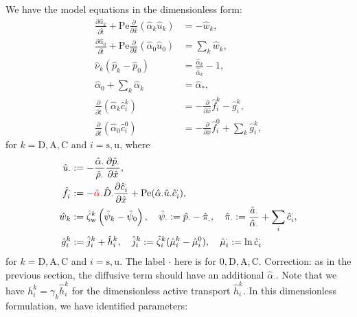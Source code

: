 \documentclass{article}
\begin{document}
We have the model equations in the dimensionless form:
\begin{align}
    \frac{\partial \hat{\alpha}_k}{\partial \hat{t}}  + \mathrm{Pe}\frac{\partial}{\partial \hat{x}}\left( \hat{\alpha}_k \hat{u}_k \right) &= - \hat{w}_k,\\ \label{eq:nd_1steq}
    \frac{\partial\hat{\alpha}_0}{\partial \hat{t}}+\mathrm{Pe}\frac{\partial}{\partial \hat{x}}\left( \hat{\alpha}_0 \hat{u}_0 \right) &=\sum_k \hat{w}_k,\\
    \hat{\nu}_k\left( \hat{p}_k - \hat{p}_0 \right) &= \frac{\hat{\alpha}_k}{\hat{\bar{\alpha}}_k}-1,\\
    \hat{\alpha}_0 + \sum_{k} \hat{\alpha}_k &= \hat{\alpha}_*,\\
    \frac{\partial}{\partial \hat{t}}\left( \hat{\alpha}_k \hat{c}_i^k \right)&=-\frac{\partial}{\partial \hat{x}} \hat{f}_i^k - \hat{g}_i^k,\\
    \frac{\partial}{\partial \hat{t}}\left( \hat{\alpha}_0 \hat{c}_i^0 \right)&=-\frac{\partial}{\partial \hat{x}} \hat{f}_i^0 + \sum_k \hat{g}_i^k,
\end{align}
    for $k=\mathrm{D},\mathrm{A},\mathrm{C}$ and $i=\mathrm{s},\mathrm{u}$, where
\begin{align}
    \hat{u}_\cdot &:= -\frac{\hat{\alpha}_\cdot}{\hat{\rho}_\cdot}\frac{\partial \hat{p}_\cdot}{\partial \hat{x}},\\
    \hat{f}_i^\cdot &:= -{\color{red}\hat{\alpha}_\cdot}\hat{D}_\cdot \frac{\partial \hat{c}_i^\cdot}{\partial \hat{x}} + \mathrm{Pe}(\hat{\alpha}_\cdot\hat{u}_\cdot\hat{c}_i^\cdot),\\
    \hat{w}_k&:= \hat{\zeta}_\mathrm{w}^k\left( \hat{\psi}_k-\hat{\psi}_0 \right),\quad\hat{\psi}_\cdot := \hat{p}_\cdot - \hat{\pi}_.,\quad \hat{\pi}_\cdot := \frac{\hat{a}_\cdot}{\hat{\alpha}_\cdot}+\sum_i \hat{c}_i^\cdot,\\
    \hat{g}_i^k &:= \hat{j}_i^k+\hat{h}_i^k,\quad \hat{j}_i^k :=\hat{\zeta}_i^k(\hat{\mu}_i^k-\hat{\mu}_i^0),\quad \hat{\mu}_i^\cdot:=\ln \hat{c}_i^\cdot\label{eq:nd_lasteq}
\end{align}
    for $k=\mathrm{D},\mathrm{A},\mathrm{C}$ and $i=\mathrm{s},\mathrm{u}$.
The label $\cdot$ here is for $0,\mathrm{D},\mathrm{A},\mathrm{C}$.
{\color{red}Correction: as in the previous section, the diffusive term should have an additional $\hat{\alpha}_\cdot$}.
Note that we have $h_i^k = \gamma_k\hat{h}_i^k$ for the dimensionless active transport $\hat{h}_i^k$.
In this dimensionless formulation, we have identified parameters:
\end{document}
